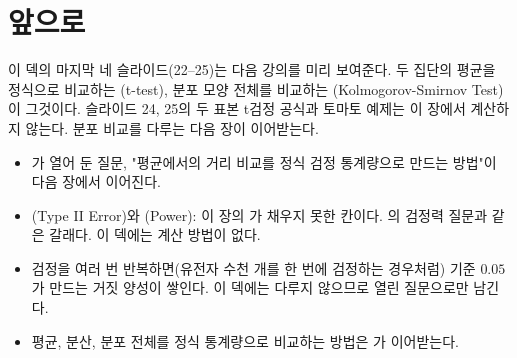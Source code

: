 \section{앞으로}
\label{sec:pv-future}

이 덱의 마지막 네 슬라이드(22--25)는 다음 강의를 미리 보여준다. 두 집단의
평균을 정식으로 비교하는 (t-test), 분포 모양 전체를 비교하는
(Kolmogorov-Smirnov Test)이 그것이다.
슬라이드 24, 25의 두 표본 t검정 공식과 토마토 예제는 이 장에서 계산하지
않는다. 분포 비교를 다루는 다음 장이 이어받는다.

\begin{itemize}
  \item {}가 열어 둔 질문, "평균에서의 거리 비교를
        정식 검정 통계량으로 만드는 방법"이 다음 장에서 이어진다.
  \item {}(Type II Error)와 (Power): 이 장의
        가 채우지 못한 칸이다. 
        의 검정력 질문과 같은 갈래다. 이 덱에는 계산 방법이 없다.
  \item 검정을 여러 번 반복하면(유전자 수천 개를 한 번에 검정하는 경우처럼)
        기준 $0.05$가 만드는 거짓 양성이 쌓인다. 이 덱에는 다루지 않으므로
        열린 질문으로만 남긴다.
  \item 평균, 분산, 분포 전체를 정식 통계량으로 비교하는 방법은 가 이어받는다.
\end{itemize}
